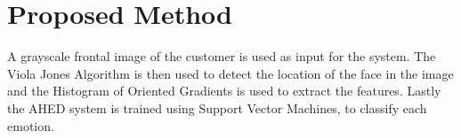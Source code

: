 \section{Proposed Method}
A grayscale frontal image of the customer is used as input for the system. The Viola Jones Algorithm is then used to detect the location of the face in the image and the Histogram of Oriented Gradients is used to extract the features. Lastly the AHED system is trained using Support Vector Machines, to classify each emotion.

